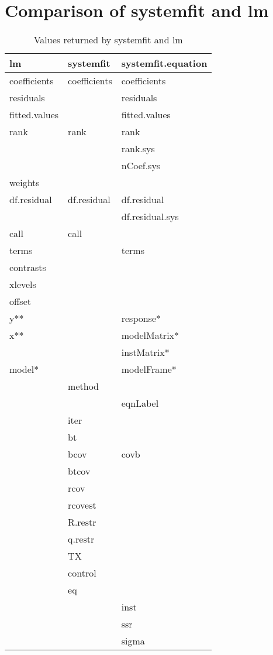 \section{Comparison of systemfit and lm}

\begin{table}[htbp]
\caption{Values returned by systemfit and lm}
\begin{tabular}{lll}
\hline
lm & systemfit & systemfit.equation \\
\hline
coefficients & coefficients & coefficients \\
residuals & & residuals \\
fitted.values & & fitted.values \\
rank & rank & rank \\
 & & rank.sys \\
 & & nCoef.sys \\
weights & & \\
df.residual & df.residual & df.residual \\
 & & df.residual.sys \\
call & call & \\
terms & & terms \\
contrasts & & \\
xlevels & & \\
offset & & \\
y** & & response* \\
x** & & modelMatrix* \\
 & & instMatrix* \\
model* & & modelFrame* \\
 & method & \\
 & & eqnLabel \\
 & iter & \\
 & bt & \\
 & bcov & covb \\
 & btcov & \\
 & rcov & \\
 & rcovest & \\
 & R.restr & \\
 & q.restr & \\
 & TX & \\
 & control & \\
 & eq & \\
 & & inst \\
 & & ssr \\
 & & sigma \\
\hline
\end{tabular}
\end{table}
